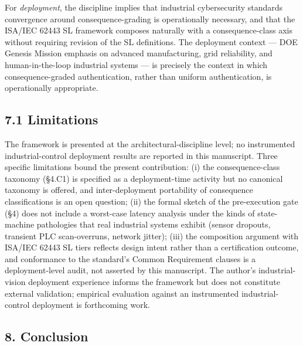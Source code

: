 For \emph{deployment}, the discipline implies that industrial
cybersecurity standards convergence around consequence-grading is
operationally necessary, and that the ISA/IEC 62443 SL framework \cite{ref1}
composes naturally with a consequence-class axis without requiring
revision of the SL definitions. The deployment context --- DOE Genesis
Mission emphasis on advanced manufacturing, grid reliability, and
human-in-the-loop industrial systems \cite{ref10} --- is precisely the
context in which consequence-graded authentication, rather than uniform
authentication, is operationally appropriate.

\subsection{7.1 Limitations}\label{limitations}

The framework is presented at the architectural-discipline level; no
instrumented industrial-control deployment results are reported in this
manuscript. Three specific limitations bound the present contribution:
(i) the consequence-class taxonomy (§4.C1) is specified as a
deployment-time activity but no canonical taxonomy is offered, and
inter-deployment portability of consequence classifications is an open
question; (ii) the formal sketch of the pre-execution gate (§4) does not
include a worst-case latency analysis under the kinds of state-machine
pathologies that real industrial systems exhibit (sensor dropouts,
transient PLC scan-overruns, network jitter); (iii) the composition
argument with ISA/IEC 62443 SL tiers \cite{ref1} reflects design intent
rather than a certification outcome, and conformance to the standard's
Common Requirement clauses is a deployment-level audit, not asserted by
this manuscript. The author's industrial-vision deployment experience
informs the framework but does not constitute external validation;
empirical evaluation against an instrumented industrial-control
deployment is forthcoming work.

\subsection{8. Conclusion}\label{conclusion}

